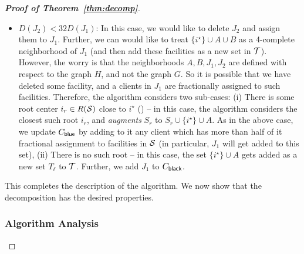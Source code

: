 \begin{proof}[{\bf Proof of Theorem~\ref{thm:decomp}}]
\begin{itemize}
\item $D(J_2) < 32 D(J_1)$: In this case, we would like to delete $J_2$ and assign them to $J_1$. Further, we can would like to treat $\{i^\star\} \cup A \cup B$ as a 4-complete neighborhood of $J_1$ (and then add these facilities as a new set in ${\cal T}$). However, the worry is that the neighborhoods $A,B, J_1, J_2$ are defined with respect to the graph 
    $H$, and not the graph $G$. So it is possible that we have deleted some facility, and a clients in $J_1$ are fractionally assigned to such facilities. Therefore, the algorithm considers two sub-cases: (i) There is some root center  $i_r \in R({\cal S})$ close to $i^\star$ () -- in this
    case, the algorithm considers the closest such root $i_r$, and {\em augments} $S_r$ to $S_r \cup \{i^\star\} \cup A$. As in the above case, 
    we update $C_{\mathsf{blue}}$ by adding to it any client which has more than half of it fractional assignment to facilities in ${\cal S}$ (in particular, $J_1$ will
    get added to this set), (ii) There is no such root -- in this case, the set $\{i^\star\} \cup A$ gets added as a new set $T_\ell$ to ${\cal T}$. Further, 
    we add $J_1$ to $C_{\mathsf{black}}$. 
    \end{itemize}

This completes the description of the algorithm. We now show that the decomposition has the desired properties. 

\subsubsection{Algorithm Analysis}


\end{proof}
